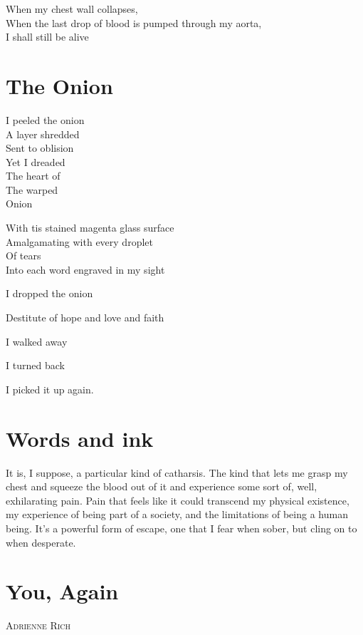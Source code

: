 \documentclass[parskip=half-,12pt,oneside,openany,a5paper,numbers=endperiod]{scrbook}
\begin{document}
When my chest wall collapses,\\
When the last drop of blood is pumped through my aorta,\\
I shall still be alive

\chapter{The Onion}

I peeled the onion\\
A layer shredded\\
Sent to oblision\\
Yet I dreaded\\
The heart of\\
The warped\\
Onion

With tis stained magenta glass surface\\
Amalgamating with every droplet\\
Of tears\\
Into each word engraved in my sight

I dropped the onion

Destitute of hope and love and faith

I walked away

I turned back

I picked it up again.

\chapter{Words and ink}

It is, I suppose, a particular kind of catharsis. The kind that lets me grasp
my chest and squeeze the blood out of it and experience some sort of, well,
exhilarating pain. Pain that feels like it could transcend my physical
existence, my experience of being part of a society, and the limitations of
being a human being. It's a powerful form of escape, one that I fear when
sober, but cling on to when desperate.

\appendix

\chapter{You, Again}

{}\hfill\textsc{Adrienne Rich}

\end{document}
